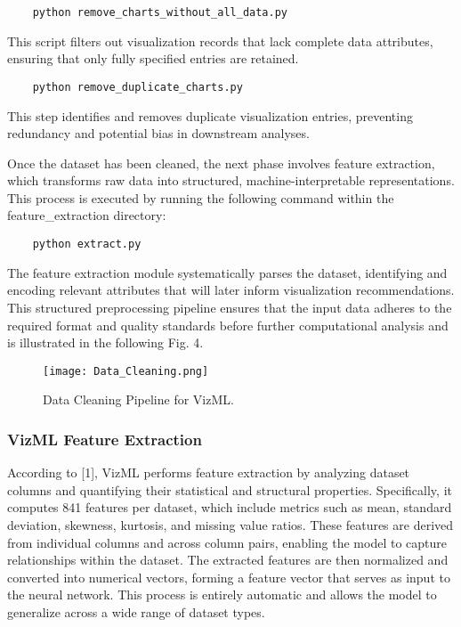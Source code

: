 \begin{verbatim}
    python remove_charts_without_all_data.py
\end{verbatim}
This script filters out visualization records that lack complete data attributes, ensuring that only fully specified entries are retained.

\begin{verbatim}
    python remove_duplicate_charts.py
\end{verbatim}
This step identifies and removes duplicate visualization entries, preventing redundancy and potential bias in downstream analyses.

Once the dataset has been cleaned, the next phase involves feature extraction, which transforms raw data into structured, machine-interpretable representations. This process is executed by running the following command within the feature\_extraction directory:
\begin{verbatim}
    python extract.py
\end{verbatim}

The feature extraction module systematically parses the dataset, identifying and encoding relevant attributes that will later inform visualization recommendations. This structured preprocessing pipeline ensures that the input data adheres to the required format and quality standards before further computational analysis and is illustrated in the following Fig. 4.

\begin{figure}[h]
    \centering
    \texttt{[image: Data\_Cleaning.png]}
    \caption{Data Cleaning Pipeline for VizML.}  
    \label{fig:datacleaning}               
\end{figure}

\vspace{10cm}
\subsubsection{ VizML Feature Extraction}
According to [1], VizML performs feature extraction by analyzing dataset columns and quantifying their statistical and structural properties. Specifically, it computes 841 features per dataset, which include metrics such as mean, standard deviation, skewness, kurtosis, and missing value ratios. These features are derived from individual columns and across column pairs, enabling the model to capture relationships within the dataset. The extracted features are then normalized and converted into numerical vectors, forming a feature vector that serves as input to the neural network. This process is entirely automatic and allows the model to generalize across a wide range of dataset types.

